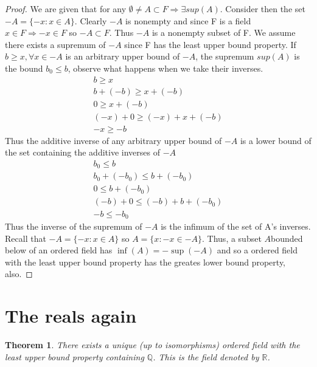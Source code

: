 \documentclass[12pt]{article}
\newtheorem{theorem}{Theorem}
\begin{document}
\begin{proof}
    We are given that for any \(\emptyset \neq A \subset F \Rightarrow \exists sup(A)\). 
    Consider then the set \(-A = \{-x : x\in A\}\). 
    Clearly \(-A\) is nonempty and since F is a field \(x\in F \Rightarrow -x \in F\) so 
    \(-A \subset F\). Thus \(-A\) is a nonempty subset of F. 
    We assume there exists a supremum of \(-A\) since F has 
    the least upper bound property.
    If \(b \geq x, \forall x \in -A\) is an arbitrary upper bound of \(-A\), 
    the supremum \(sup(A)\) is the bound 
    \(b_0 \leq b\), observe what happens when we take their inverses. 
    \begin{gather*}
        b \geq x \\ 
        b + (-b) \geq x + (-b) \\ 
        0 \geq x + (-b) \\ 
        (-x) + 0 \geq (-x) + x + (-b) \\ 
        -x \geq -b
    \end{gather*}
    Thus the additive inverse of any arbitrary upper bound of \(-A\) is a lower bound of 
    the set containing the additive inverses of \(-A\)
    \begin{gather*}
        b_0 \leq b \\ 
        b_0 + (-b_0) \leq b + (-b_0) \\ 
        0 \leq b +(-b_0) \\ 
        (-b) + 0\leq (-b) + b + (-b_0) \\ 
        -b \leq -b_0
    \end{gather*} 
    Thus the inverse of the supremum of \(-A\) is the infimum of the set of A's inverses. 
    Recall that \(-A = \{-x : x \in A\}\) so \(A = \{x : -x \in -A\}\). 
    Thus, a subset \(A\)bounded below of an ordered field has \(\inf(A) = -\sup(-A)\) 
    and so a ordered field with the least upper bound property has the greates lower
    bound property, also.

\end{proof}

\break
\section*{The reals again}
\begin{theorem}
    There exists a unique (up to isomorphisms) ordered field with the least upper bound 
    property containing \(\mathbb Q\). This is the field denoted by \(\mathbb R\).
\end{theorem}
\end{document}
